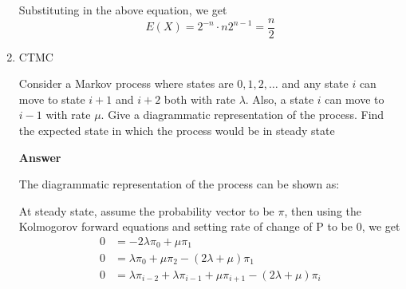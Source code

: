 \documentclass[12pt, oneside]{article}
\begin{document}
\begin{enumerate}
{    Substituting in the above equation, we get
    \[E(X) = 2^{-n} \cdot n 2^{n - 1} = \frac{n}{2}\]
}

\item {
    CTMC

    Consider a Markov process where states are \(0, 1, 2, \ldots\) and any state \(i\)
    can move to state \(i + 1\) and \(i + 2\) both with rate \(\lambda\). Also, a state
    \(i\) can move to \(i - 1\) with rate \(\mu\). Give a diagrammatic representation of
    the process. Find the expected state in which the process would be in steady state

    \textbf{Answer}

    The diagrammatic representation of the process can be shown as:

    \begin{center}
    \end{center}

    At steady state, assume the probability vector to be \(\pi\), then using the Kolmogorov
    forward equations and setting rate of change of P to be 0, we get
    \begin{align*}
        0 &= -2\lambda\pi_0 + \mu \pi_1 \\
        0 &= \lambda\pi_0 + \mu\pi_2 - (2\lambda + \mu)\pi_1 \\
        0 &= \lambda\pi_{i-2} + \lambda\pi_{i-1} + \mu\pi_{i+1} - (2\lambda + \mu)\pi_i
    \end{align*}

}
\end{enumerate}
\end{document}
